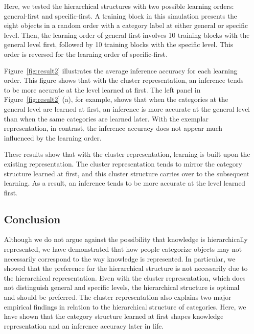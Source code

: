 \documentclass[doc]{apa6}
\begin{document}
Here, we tested the hierarchical structures with two possible learning orders: general-first and
specific-first. A training block in this simulation presents the eight objects in a random order
with a category label at either general or specific level. Then, the learning order of general-first
involves 10 training blocks with the general level first, followed by 10 training blocks with the
specific level. This order is reversed for the learning order of specific-first.

Figure~\ref{fig:result2} illustrates the average inference accuracy for each learning order. This
figure shows that with the cluster representation, an inference tends to be more accurate at the
level learned at first.  The left panel in Figure~\ref{fig:result2} (a), for example, shows that
when the categories at the general level are learned at first, an inference is more accurate at the
general level than when the same categories are learned later. With the exemplar representation, in
contrast, the inference accuracy does not appear much influenced by the learning order.

These results show that with the cluster representation, learning is built upon the existing
representation. The cluster representation tends to mirror the category structure learned at first,
and this cluster structure carries over to the subsequent learning. As a result, an inference tends
to be more accurate at the level learned first.


\subsection*{Conclusion}

Although we do not argue against the possibility that knowledge is hierarchically represented, we
have demonstrated that how people categorize objects may not necessarily correspond to the way
knowledge is represented. In particular, we showed that the preference for the hierarchical
structure is not necessarily due to the hierarchical representation. Even with the cluster
representation, which does not distinguish general and specific levels, the hierarchical structure
is optimal and should be preferred.  The cluster representation also explains two major empirical
findings in relation to the hierarchical structure of categories. Here, we have shown that the
category structure learned at first shapes knowledge representation and an inference accuracy later
in life.


\end{document}
